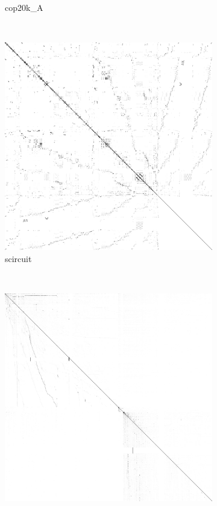 \begin{figure}
\begin{multicols}{4}
\begin{subfigure}{\linewidth}
\caption{cop20k\_A}
\end{subfigure}~%
\begin{subfigure}{\linewidth}
\includegraphics[width=\linewidth]{images/scircuit}
\caption{scircuit}
\end{subfigure}~%
\begin{subfigure}{\linewidth}
\includegraphics[width=\linewidth]{images/webbase-1M}

\end{subfigure}
\end{multicols}
\end{figure}
